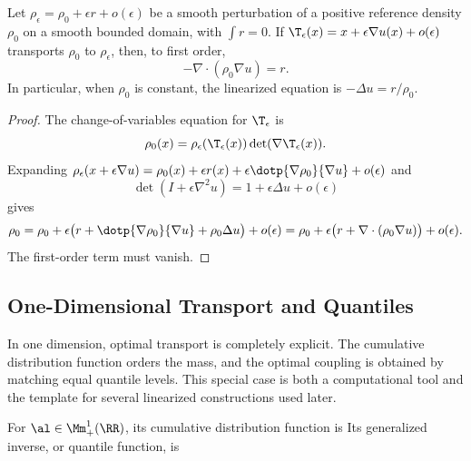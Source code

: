 \begin{prop}\label{prop-linearized-monge-ampere}
	Let $\rho_\epsilon=\rho_0+\epsilon r+o(\epsilon)$ be a smooth perturbation of a positive reference density $\rho_0$ on a smooth bounded domain, with $\int r=0$. If $\T_\epsilon(x)=x+\epsilon\nabla u(x)+o(\epsilon)$ transports $\rho_0$ to $\rho_\epsilon$, then, to first order,
	\[
		-\nabla\cdot(\rho_0\nabla u)=r.
	\]
	In particular, when $\rho_0$ is constant, the linearized equation is $-\Delta u=r/\rho_0$.
\end{prop}
\begin{proof}
	The change-of-variables equation for $\T_\epsilon$ is
	\[
		\rho_0(x)
		=
		\rho_\epsilon(\T_\epsilon(x))\det(\nabla \T_\epsilon(x)).
	\]
	Expanding $\rho_\epsilon(x+\epsilon\nabla u)=\rho_0(x)+\epsilon r(x)+\epsilon\dotp{\nabla\rho_0}{\nabla u}+o(\epsilon)$ and
	\[
		\det(I+\epsilon\nabla^2u)=1+\epsilon\Delta u+o(\epsilon)
	\]
	gives
	\[
		\rho_0
		=
		\rho_0+
		\epsilon\bigl(r+\dotp{\nabla\rho_0}{\nabla u}+\rho_0\Delta u\bigr)+o(\epsilon)
		=
		\rho_0+
		\epsilon\bigl(r+\nabla\cdot(\rho_0\nabla u)\bigr)+o(\epsilon).
	\]
	The first-order term must vanish.
\end{proof}

\subsection{One-Dimensional Transport and Quantiles}
\label{sec-1d-transport-quantiles}

In one dimension, optimal transport is completely explicit. The cumulative distribution function orders the mass, and the optimal coupling is obtained by matching equal quantile levels. This special case is both a computational tool and the template for several linearized constructions used later.

\begin{defn}\label{def-cdf-quantile}
	For $\al\in\Mm_+^1(\RR)$, its cumulative distribution function is
	\eql{\label{eq-cumul-defn}
		\cumul{\al}(x)\eqdef\al((-\infty,x]).
	}
	Its generalized inverse, or quantile function, is
\end{defn}

